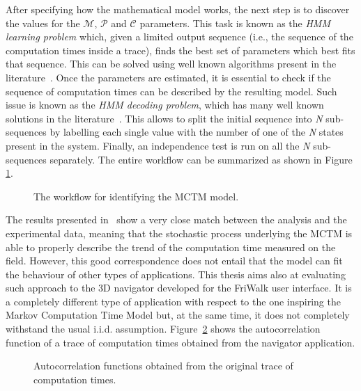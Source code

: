After specifying how the mathematical model works, the next step is to discover
the values for the \(\mathcal{M}\), \(\mathcal{P}\) and \(\mathcal{C}\) parameters. This task is known as the
\emph{HMM learning problem} which, given a limited output sequence (i.e., the
sequence of the computation times inside a trace),
finds the best set of parameters which best fits that sequence.
This can be solved using well known algorithms present in the
literature~\cite{baum1972inequality}.
Once the parameters are estimated, it is essential to check if the sequence of
computation times can be described by the resulting model.
Such issue is known as the \emph{HMM decoding problem}, which has many well
known solutions in the literature~\cite{forney1973viterbi}. This allows to split
the initial sequence into \emph{N} sub-sequences by labelling each single value
with the number of one of the \emph{N} states present in the system.
Finally, an independence test is run on all the \emph{N} sub-sequences separately.
The entire workflow can be summarized as shown in Figure \ref{img:hmm_workflow}.
\begin{figure}[!htb]
    \caption{The workflow for identifying the MCTM model.}
    \label{img:hmm_workflow}
\end{figure}

The results presented in~\cite{villalba2017probabilistic} show a very close match
between the analysis and the experimental data, meaning that the stochastic
process underlying the MCTM is able to properly describe the trend of the
computation time measured on the field.
However, this good correspondence does not entail that the model can fit the
behaviour of other types of applications. This thesis aims also at evaluating such
approach to the 3D navigator developed for the FriWalk user interface.
It is a completely different type of application with respect to the one
inspiring the Markov Computation Time Model but, at the same time, it does not
completely withstand the usual i.i.d. assumption. Figure~\ref{img:mctm_1_state} shows the autocorrelation function of a trace of computation times obtained from the navigator application.
\begin{figure}[!htb]
    \caption{Autocorrelation functions obtained from the original trace of computation times.}
    \label{img:mctm_1_state}
\end{figure}

